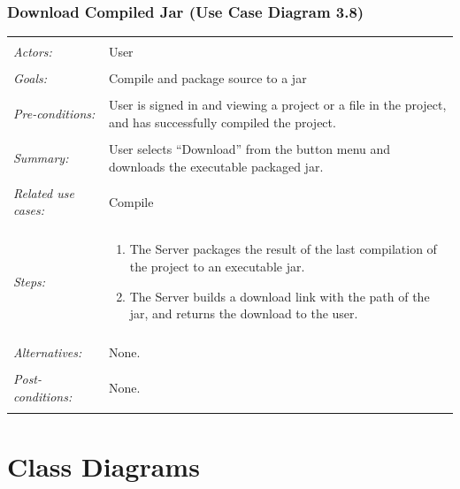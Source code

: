 \documentclass[11pt]{report}
\begin{document}
\subsection{Download Compiled Jar (Use Case Diagram 3.8)}
\begin{tabular}{ p{2cm} p{12cm} }
     \hline
     \\
     \textit{Actors:} & User \\ 
     \\
     \textit{Goals:} & Compile and package source to a jar\\
     \\
     \textit{Pre-conditions:} & User is signed in and viewing a project or a file in the project, and has successfully compiled the project. \\
     \\
     \textit{Summary:} & User selects ``Download'' from the button menu and downloads the executable packaged jar. \\
     \\
     \textit{Related use cases:} & Compile \\ 
     \\
     \textit{Steps:} & \begin{enumerate}
        \item The Server packages the result of the last compilation of the project to an executable jar.
        \item The Server builds a download link with the path of the jar, and returns the download to the user.
     \end{enumerate} \\
     \\
     \textit{Alternatives:} & None. \\
     \\
     \textit{Post-conditions:} & None. \\
     \\
    \hline
\end{tabular}



\chapter{Class Diagrams}
\end{document}

